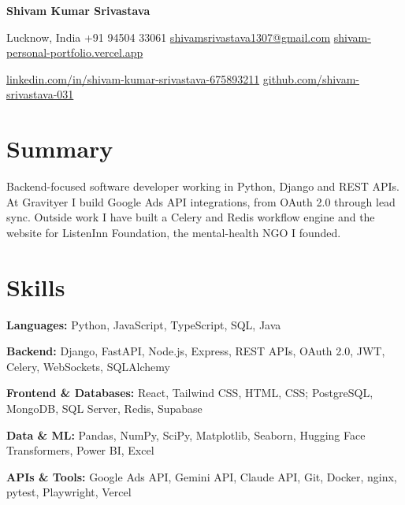 \documentclass[10pt,a4paper]{article}
\begin{document}
\begin{center}
  {\LARGE\bfseries Shivam Kumar Srivastava}\par\vspace{3pt}
  Lucknow, India \textbar{} +91 94504 33061 \textbar{}
  \href{mailto:shivamsrivastava1307@gmail.com}{shivamsrivastava1307@gmail.com} \textbar{}
  \href{https://shivam-personal-portfolio.vercel.app}{shivam-personal-portfolio.vercel.app}\par
  \href{https://linkedin.com/in/shivam-kumar-srivastava-675893211}{linkedin.com/in/shivam-kumar-srivastava-675893211} \textbar{}
  \href{https://github.com/shivam-srivastava-031}{github.com/shivam-srivastava-031}
\end{center}

\section{Summary}
Backend-focused software developer working in Python, Django and REST APIs. At Gravityer I build Google Ads
API integrations, from OAuth 2.0 through lead sync. Outside work I have built a Celery and Redis workflow engine
and the website for ListenInn Foundation, the mental-health NGO I founded.

\section{Skills}
\textbf{Languages:} Python, JavaScript, TypeScript, SQL, Java\par
\textbf{Backend:} Django, FastAPI, Node.js, Express, REST APIs, OAuth 2.0, JWT, Celery, WebSockets, SQLAlchemy\par
\textbf{Frontend \& Databases:} React, Tailwind CSS, HTML, CSS; PostgreSQL, MongoDB, SQL Server, Redis, Supabase\par
\textbf{Data \& ML:} Pandas, NumPy, SciPy, Matplotlib, Seaborn, Hugging Face Transformers, Power BI, Excel\par
\textbf{APIs \& Tools:} Google Ads API, Gemini API, Claude API, Git, Docker, nginx, pytest, Playwright, Vercel

\end{document}
